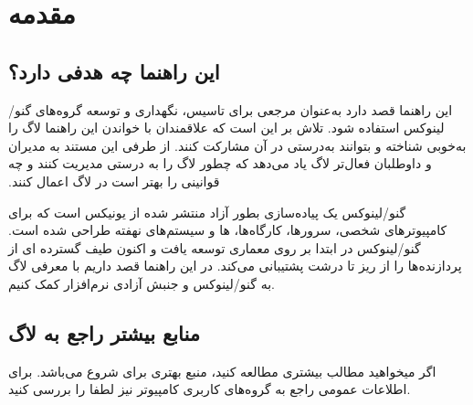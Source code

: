 \section{مقدمه}

\subsection{این راهنما چه هدفی دارد؟}

این راهنما قصد دارد به‌عنوان مرجعی برای تاسیس، نگهداری و توسعه گروه‌های گنو/لینوکس استفاده شود.
تلاش بر این است که علاقمندان با خواندن این راهنما لاگ را ‫به‌خوبی شناخته و بتوانند به‌درستی در آن
مشارکت کنند. از طرفی این مستند به مدیران و داوطلبان فعال‌تر لاگ یاد می‌دهد که چطور لاگ را به درستی
مدیریت کنند و چه قوانینی را بهتر است در لاگ اعمال کنند.

گنو/لینوکس یک پیاده‌سازی بطور آزاد منتشر شده از یونیکس است که برای کامپیوترهای شخصی،
سرورها، کارگاه‌ها، ‌ها و سیستم‌های نهفته طراحی شده است.
گنو/لینوکس در ابتدا بر روی معماری  توسعه یافت و اکنون طیف گسترده ای از پردازنده‌ها
را از ریز تا درشت پشتیبانی می‌کند. در این راهنما قصد داریم با معرفی لاگ به گنو/لینوکس و جنبش
آزادی نرم‌افزار کمک کنیم.

%

\subsection{منابع بیشتر راجع به لاگ}

اگر میخواهید مطالب بیشتری مطالعه کنید،
منبع بهتری برای شروع می‌باشد. برای اطلاعات عمومی راجع به گروه‌های کاربری کامپیوتر نیز لطفا
را بررسی کنید.


